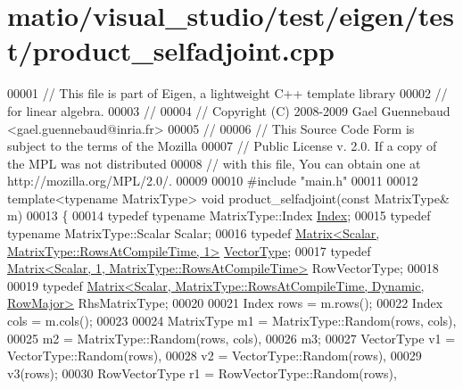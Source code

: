\hypertarget{matio_2visual__studio_2test_2eigen_2test_2product__selfadjoint_8cpp_source}{}\section{matio/visual\+\_\+studio/test/eigen/test/product\+\_\+selfadjoint.cpp}
\label{matio_2visual__studio_2test_2eigen_2test_2product__selfadjoint_8cpp_source}

\begin{DoxyCode}
00001 \textcolor{comment}{// This file is part of Eigen, a lightweight C++ template library}
00002 \textcolor{comment}{// for linear algebra.}
00003 \textcolor{comment}{//}
00004 \textcolor{comment}{// Copyright (C) 2008-2009 Gael Guennebaud <gael.guennebaud@inria.fr>}
00005 \textcolor{comment}{//}
00006 \textcolor{comment}{// This Source Code Form is subject to the terms of the Mozilla}
00007 \textcolor{comment}{// Public License v. 2.0. If a copy of the MPL was not distributed}
00008 \textcolor{comment}{// with this file, You can obtain one at http://mozilla.org/MPL/2.0/.}
00009 
00010 \textcolor{preprocessor}{#include "main.h"}
00011 
00012 \textcolor{keyword}{template}<\textcolor{keyword}{typename} MatrixType> \textcolor{keywordtype}{void} product\_selfadjoint(\textcolor{keyword}{const} MatrixType& m)
00013 \{
00014   \textcolor{keyword}{typedef} \textcolor{keyword}{typename} MatrixType::Index \hyperlink{namespace_eigen_a62e77e0933482dafde8fe197d9a2cfde}{Index};
00015   \textcolor{keyword}{typedef} \textcolor{keyword}{typename} MatrixType::Scalar Scalar;
00016   \textcolor{keyword}{typedef} \hyperlink{group___core___module_class_eigen_1_1_matrix}{Matrix<Scalar, MatrixType::RowsAtCompileTime, 1>} 
      \hyperlink{struct_vector_type}{VectorType};
00017   \textcolor{keyword}{typedef} \hyperlink{group___core___module_class_eigen_1_1_matrix}{Matrix<Scalar, 1, MatrixType::RowsAtCompileTime>} 
      RowVectorType;
00018 
00019   \textcolor{keyword}{typedef} \hyperlink{group___core___module_class_eigen_1_1_matrix}{Matrix<Scalar, MatrixType::RowsAtCompileTime, Dynamic, RowMajor>}
       RhsMatrixType;
00020 
00021   Index rows = m.rows();
00022   Index cols = m.cols();
00023 
00024   MatrixType m1 = MatrixType::Random(rows, cols),
00025              m2 = MatrixType::Random(rows, cols),
00026              m3;
00027   VectorType v1 = VectorType::Random(rows),
00028              v2 = VectorType::Random(rows),
00029              v3(rows);
00030   RowVectorType r1 = RowVectorType::Random(rows),

\end{DoxyCode}
